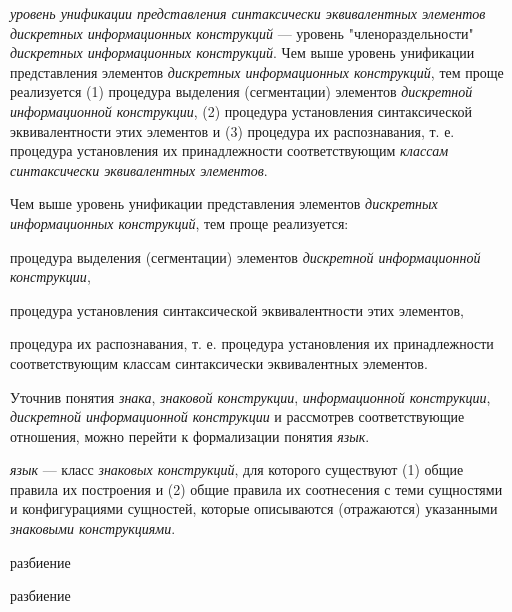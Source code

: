 \textit{уровень унификации представления синтаксически эквивалентных элементов дискретных информационных конструкций\scnsupergroupsign} --- уровень "членораздельности"{} \textit{дискретных информационных конструкций}.
Чем выше уровень унификации представления элементов \textit{дискретных информационных конструкций}, тем проще реализуется (1) процедура выделения (сегментации) элементов \textit{дискретной информационной конструкции}, (2) процедура установления синтаксической эквивалентности этих элементов и (3) процедура их распознавания, т. е. процедура установления их принадлежности соответствующим \textit{классам синтаксически эквивалентных элементов}.

Чем выше уровень унификации представления элементов \textit{дискретных информационных конструкций}, тем проще реализуется:
\begin{textitemize}
    \item процедура выделения (сегментации) элементов \textit{дискретной информационной конструкции},
    \item процедура установления синтаксической эквивалентности этих элементов,
    \item процедура их распознавания, т. е. процедура установления их принадлежности соответствующим классам синтаксически эквивалентных элементов.
\end{textitemize}

Уточнив понятия \textit{знака}, \textit{знаковой конструкции}, \textit{информационной конструкции}, \textit{дискретной информационной конструкции} и рассмотрев соответствующие отношения, можно перейти к формализации понятия \textit{язык}.

\textit{язык} --- класс \textit{знаковых конструкций}, для которого существуют (1) общие правила их построения и (2) общие правила их соотнесения с теми сущностями и конфигурациями сущностей, которые описываются (отражаются) указанными \textit{знаковыми конструкциями}.

\begin{SCn}

    \begin{scnrelfromset}{разбиение}
        \begin{scnindent}
	        \begin{scnrelfromset}{разбиение}
    	    \end{scnrelfromset}
	    \end{scnindent}
    \end{scnrelfromset}

\end{SCn}

